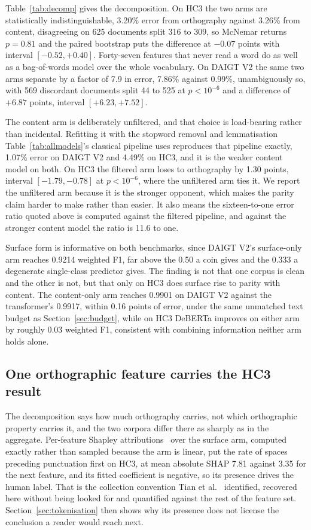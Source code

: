 \documentclass[conference,a4paper]{IEEEtran}
\begin{document}
Table~\ref{tab:decomp} gives the decomposition. On HC3 the two arms are statistically indistinguishable, 3.20\% error from orthography against 3.26\% from content, disagreeing on 625 documents split 316 to 309, so McNemar returns $p=0.81$ and the paired bootstrap puts the difference at $-0.07$ points with interval $[-0.52, +0.40]$. Forty-seven features that never read a word do as well as a bag-of-words model over the whole vocabulary. On DAIGT V2 the same two arms separate by a factor of 7.9 in error, 7.86\% against 0.99\%, unambiguously so, with 569 discordant documents split 44 to 525 at $p < 10^{-6}$ and a difference of $+6.87$ points, interval $[+6.23, +7.52]$.

The content arm is deliberately unfiltered, and that choice is load-bearing rather than incidental. Refitting it with the stopword removal and lemmatisation Table~\ref{tab:allmodels}'s classical pipeline uses reproduces that pipeline exactly, 1.07\% error on DAIGT V2 and 4.49\% on HC3, and it is the weaker content model on both. On HC3 the filtered arm loses to orthography by 1.30 points, interval $[-1.79, -0.78]$ at $p < 10^{-6}$, where the unfiltered arm ties it. We report the unfiltered arm because it is the stronger opponent, which makes the parity claim harder to make rather than easier. It also means the sixteen-to-one error ratio quoted above is computed against the filtered pipeline, and against the stronger content model the ratio is 11.6 to one.

Surface form is informative on both benchmarks, since DAIGT V2's surface-only arm reaches 0.9214 weighted F1, far above the 0.50 a coin gives and the 0.333 a degenerate single-class predictor gives. The finding is not that one corpus is clean and the other is not, but that only on HC3 does surface rise to parity with content. The content-only arm reaches 0.9901 on DAIGT V2 against the transformer's 0.9917, within 0.16 points of error, under the same unmatched text budget as Section~\ref{sec:budget}, while on HC3 DeBERTa improves on either arm by roughly 0.03 weighted F1, consistent with combining information neither arm holds alone.

\subsection{One orthographic feature carries the HC3 result}
\label{sec:shap}

The decomposition says how much orthography carries, not which orthographic property carries it, and the two corpora differ there as sharply as in the aggregate. Per-feature Shapley attributions~\cite{Lundberg2017unified} over the surface arm, computed exactly rather than sampled because the arm is linear, put the rate of spaces preceding punctuation first on HC3, at mean absolute SHAP 7.81 against 3.35 for the next feature, and its fitted coefficient is negative, so its presence drives the human label. That is the collection convention Tian et al.~\cite{Tian2023multiscale} identified, recovered here without being looked for and quantified against the rest of the feature set. Section~\ref{sec:tokenisation} then shows why its presence does not license the conclusion a reader would reach next.
\end{document}
